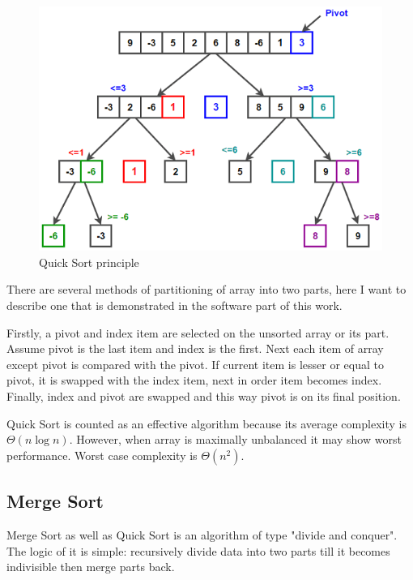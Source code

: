\documentclass[
  field=inf,
  biblatex,
  language=english,
  glossaries,
  index
]{kidiplom}
\begin{document}
\begin{figure}[H]
\begin{center}
	
	\includegraphics[scale=0.7]{img/Quicksort.png}
	\caption{Quick Sort principle}\label{fig:insert}
\end{center}
\end{figure}

There are several methods of partitioning of array into two parts, here I want to describe one that is demonstrated in the software part of this work.

Firstly, a pivot and index item are selected on the unsorted array or its part. Assume pivot is the last item and index is the first. Next each item of array except pivot is compared with the pivot. If current item is lesser or equal to pivot, it is swapped with the index item, next in order item becomes index. Finally, index and pivot are swapped and this way pivot is on its final position.

Quick Sort is counted as an effective algorithm because its average complexity is $\Theta(n \log n)$. However, when array is maximally unbalanced it may show worst performance. Worst case complexity is $\Theta(n^2)$.

\subsection{Merge Sort}

Merge Sort as well as Quick Sort is an algorithm of type "divide and conquer". The logic of it is simple: recursively divide data into two parts till it becomes indivisible then merge parts back.
\end{document}
